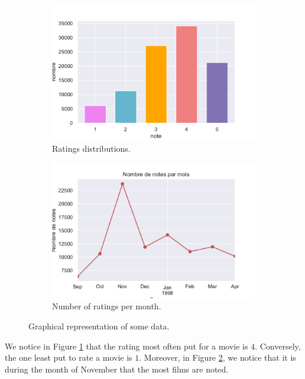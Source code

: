 \documentclass{article}
\begin{document}
\begin{figure}[H]
\centering
\begin{subfigure}{.5\textwidth}
  \centering
  \includegraphics[width=1\linewidth]{./images/distrib_notes.pdf}
  \caption{Ratings distributions.}
  \label{fig:distri_notes}
\end{subfigure}%
\begin{subfigure}{.5\textwidth}
  \centering
  \includegraphics[width=1\linewidth, clip,trim={0cm 0cm 0cm 0.6cm} ]{./images/notes_mois.pdf}
  \caption{Number of ratings per month.}
  \label{fig:mois}
\end{subfigure}
\caption{Graphical representation of some data.}
\label{fig:notes_mois}
\end{figure}

We notice in Figure \ref{fig:distri_notes} that the rating most often put for a movie is $4$. Conversely, the one least put to rate a movie is $1$. Moreover, in Figure \ref{fig:mois}, we notice that it is during the month of November that the most films are noted.
\end{document}
